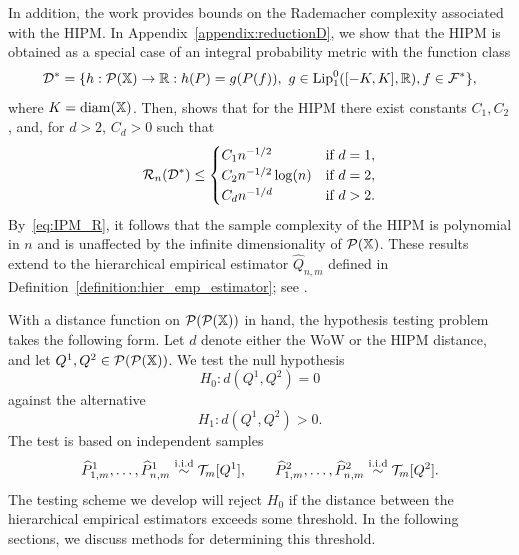 In addition, the work \cite{catalano2024hierarchical} provides bounds on the Rademacher complexity associated with the HIPM. In Appendix~\ref{appendix:reductionD}, we show that the HIPM is obtained as a special case of an integral probability metric with the function class
\[
\mathcal{D}^* = \{h:\mathcal{P}(\mathbb{X})\to \mathbb{R}: h(P) = g(P(f)), \ g\in \mathrm{Lip}_1^0([-K,K],\mathbb{R}), f\in \mathcal{F}^* \},
\]
where $K = \operatorname{diam}(\mathbb{X})$.
Then, \citet[Theorem 4.3]{catalano2024hierarchical} shows that for the HIPM there exist constants $C_1, C_2$, and, for $d > 2$, $C_d > 0$ such that
\begin{equation}
\label{eq:rademacher_hipm}
 \mathcal{R}_n(\mathcal{D}^*) \le 
\begin{cases}
C_1 n^{-1/2} & \text{if } d = 1, \\
C_2 n^{-1/2} \log(n) & \text{if } d = 2, \\
C_d n^{-1/d} & \text{if } d > 2.
\end{cases}
\end{equation}
By~\eqref{eq:IPM_R}, it follows that the sample complexity of the HIPM is polynomial in $n$ and is unaffected by the infinite dimensionality of $\mathcal{P}(\mathbb{X})$. These results extend to the hierarchical empirical estimator $\widehat{Q}_{n,m}$ defined in Definition~\ref{definition:hier_emp_estimator}; see \citet[Theorem 4.4]{catalano2024hierarchical}.

With a distance function on $\mathcal{P}(\mathcal{P}(\mathbb{X}))$ in hand, the hypothesis testing problem takes the following form. Let $d$ denote either the WoW or the HIPM distance, and let $Q^1, Q^2 \in \mathcal{P}(\mathcal{P}(\mathbb{X}))$. We test the null hypothesis
\[
H_0 : d(Q^1, Q^2) = 0
\]
against the alternative
\[
H_1 : d(Q^1, Q^2) > 0.
\]
The test is based on independent samples
\[
\widehat{P}^1_{1,m}, \dots, \widehat{P}^1_{n,m} \overset{\mathrm{i.i.d}}{\sim} \mathcal{T}_m[Q^1],
\qquad
\widehat{P}^2_{1,m}, \dots, \widehat{P}^2_{n,m} \overset{\mathrm{i.i.d}}{\sim} \mathcal{T}_m[Q^2].
\]
The testing scheme we develop will reject $H_0$ if the distance between the hierarchical empirical estimators exceeds some threshold. In the following sections, we discuss methods for determining this threshold.





















 

